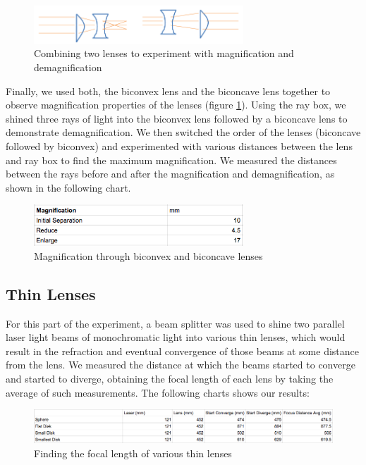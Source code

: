 \documentclass{article}
\begin{document}
\begin{figure}[H]
    \centering
    \includegraphics[width=0.7\textwidth]{charts/magnification}
    \caption{Combining two lenses to experiment with magnification and
    demagnification}
    \label{magnification}
\end{figure}

Finally, we used both, the biconvex lens and the biconcave lens together to observe
magnification properties of the lenses (figure \ref{magnification}). Using the
ray box, we shined three rays of light into the biconvex lens followed by a
biconcave lens to demonstrate demagnification. We then switched the order of the
lenses (biconcave followed by biconvex) and experimented with various distances
between the lens and ray box to find the maximum magnification. We measured the
distances between the rays before and after the magnification and
demagnification, as shown in the following chart.

\begin{figure}[H]
    \centering
    \includegraphics[width=0.7\textwidth]{charts/thick_lenses_magnification}
    \caption{Magnification through biconvex and biconcave lenses}
    \label{thick_lenses_magnification}
\end{figure}

\subsection{Thin Lenses}

For this part of the experiment, a beam splitter was used to shine two parallel
laser light beams of monochromatic light into various thin lenses, which would
result in the refraction and eventual convergence of those beams at some distance
from the lens. We measured the distance at which the beams started to converge
and started to diverge, obtaining the focal length of each lens by taking the
average of such measurements. The following charts shows our results:

\begin{figure}[H]
    \centering
    \includegraphics[width=\textwidth]{charts/thin_lenses}
    \caption{Finding the focal length of various thin lenses}
    \label{thin_lenses}
\end{figure}
\end{document}
